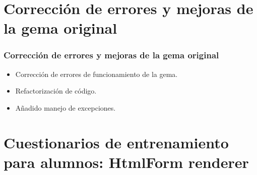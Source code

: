\documentclass{beamer}
\begin{document}

\section{Corrección de errores y mejoras de la gema original}
\begin{frame}
\frametitle{Corrección de errores y mejoras de la gema original}
  
  \begin{itemize}
    \item Corrección de errores de funcionamiento de la gema.
    \item Refactorización de código.
    \item Añadido manejo de excepciones.
  \end{itemize}
\end{frame}
  
\section{Cuestionarios de entrenamiento para alumnos: HtmlForm renderer}
  
\end{document}
